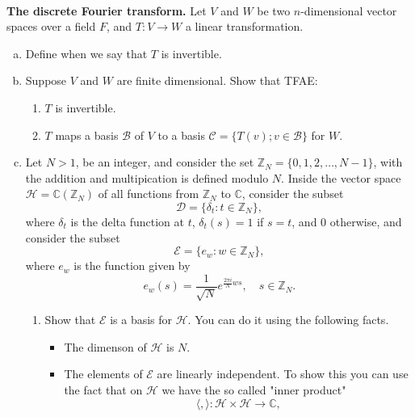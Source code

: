 \documentclass{article}
\def\zz{{\mathbb Z}}
\def\cc{{\mathbb C}}
\begin{document}
\begin{problem} \\ 
    \textbf{The discrete Fourier transform.} Let $V$ and $W$ be two $n$-dimensional vector spaces over a field $F$, and $T: V \to W$ a linear transformation.
    \begin{enumerate}[(a)]
        \item Define when we say that $T$ is invertible.
        \item Suppose $V$ and $W$ are finite dimensional. Show that TFAE:
        \begin{enumerate}[1.]
            \item $T$ is invertible.
            \item $T$ maps a basis $\mathscr{B}$ of $V$ to a basis $\mathscr{C} = \{ T(v) ; v \in \mathscr{B} \}$ for $W$.
        \end{enumerate}
        \item Let $N > 1$, be an integer, and consider the set $\zz_N = \{ 0, 1, 2, \ldots, N-1 \}$, with the addition and multipication is defined modulo $N$. Inside the vector space $\mathscr{H} = \cc(\zz_N)$ of all functions from $\zz_N$ to $\cc$, consider the subset
        \begin{equation*}
            \mathscr{D} = \{ \delta_t : t \in \zz_N \}, 
        \end{equation*}
        where $\delta_t$ is the delta function at $t$, $\delta_t(s) = 1$ if $s = t$, and $0$ otherwise, and consider the subset 
        \begin{equation*}
            \mathscr{E} = \{e_w : w \in \zz_N \},
        \end{equation*}
        where $e_w$ is the function given by 
        \[
            e_w(s) = \frac{1}{\sqrt{N}}e^{\frac{2 \pi i}{ N} ws}, \quad s \in \zz_N.
        \]
        \begin{enumerate}[1.]
            \item Show that $\mathscr{E}$ is a basis for $\mathscr{H}$. You can do it using the following facts.
            \begin{itemize}
                \item The dimenson of $\mathscr{H}$ is $N$.
                \item The elements of $\mathscr{E}$ are linearly independent. To show this you can use the fact that on $\mathscr{H}$ we have the so called "inner product"
                \begin{equation*}
                    \langle , \rangle : \mathscr{H} \times \mathscr{H} \to \cc,

\end{equation*}
\end{itemize}
\end{enumerate}
\end{enumerate}
\end{problem}
\end{document}
